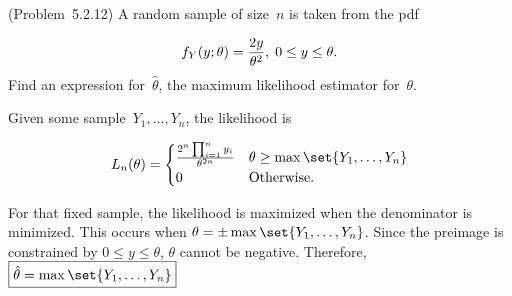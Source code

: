 \begin{problem}
  (\textnormal{Problem~5.2.12}) A random sample of size~$n$ is taken from the pdf

  \begin{equation}\label{eq:P06}
    f_{Y}(y;\theta) = \frac{2y}{\theta^2}, \hspace{0.1cm} 0 \leq y \leq \theta\text{.}
  \end{equation}
  Find an expression for~$\hat{\theta}$, the maximum likelihood estimator for~$\theta$.
\end{problem}

Given some sample~${Y_1,\ldots,Y_n}$, the likelihood is

\begin{equation}\label{eq:P06:Likelihood}
  L_n(\theta) = \begin{cases}
    \frac{2^n \prod_{i=1}^n y_i}{\theta^{2n}} & \theta \geq \max\set{Y_1,\ldots,Y_n} \\
                  0 & \text{Otherwise}\text{.}
                \end{cases}
\end{equation}

\noindent
For that fixed sample, the likelihood is maximized when the denominator is minimized.  This occurs when ${\theta = \pm\max\set{Y_1,\ldots,Y_n}}$.  Since the preimage is constrained by ${0 \leq y \leq \theta}$, $\theta$ cannot be negative.  Therefore, $\boxed{{\hat{\theta} = \max\set{Y_1,\ldots,Y_n}}}$


